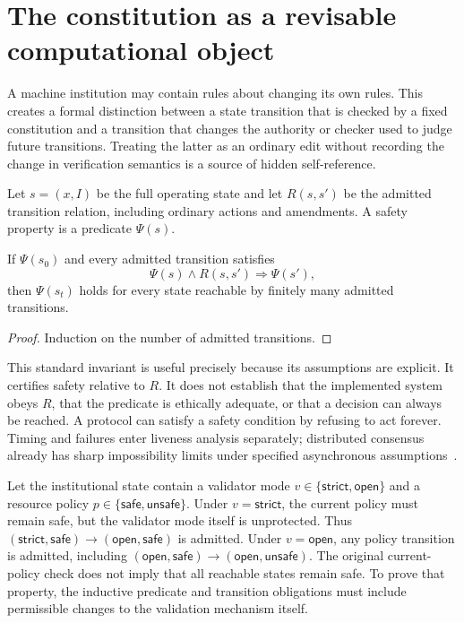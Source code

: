 \section{The constitution as a revisable computational object}\label{MS:sec:constitution}

A machine institution may contain rules about changing its own rules. This creates a formal distinction between a state transition that is checked by a fixed constitution and a transition that changes the authority or checker used to judge future transitions. Treating the latter as an ordinary edit without recording the change in verification semantics is a source of hidden self-reference.

Let $s=(x,I)$ be the full operating state and let $R(s,s')$ be the admitted transition relation, including ordinary actions and amendments. A safety property is a predicate $\Psi(s)$.

\begin{MSproposition}\label{MS:prop:safety}
If $\Psi(s_0)$ and every admitted transition satisfies
\[
\Psi(s)\wedge R(s,s')\Longrightarrow\Psi(s'),
\]
then $\Psi(s_t)$ holds for every state reachable by finitely many admitted transitions.
\end{MSproposition}
\begin{proof}
Induction on the number of admitted transitions.
\end{proof}

This standard invariant is useful precisely because its assumptions are explicit. It certifies safety relative to $R$. It does not establish that the implemented system obeys $R$, that the predicate is ethically adequate, or that a decision can always be reached. A protocol can satisfy a safety condition by refusing to act forever. Timing and failures enter liveness analysis separately; distributed consensus already has sharp impossibility limits under specified asynchronous assumptions~\cite{MS:flp}.

\begin{MScounterexample}\label{MS:ex:checker}
Let the institutional state contain a validator mode $v\in\{\mathsf{strict},\mathsf{open}\}$ and a resource policy $p\in\{\mathsf{safe},\mathsf{unsafe}\}$. Under $v=\mathsf{strict}$, the current policy must remain safe, but the validator mode itself is unprotected. Thus $(\mathsf{strict},\mathsf{safe})\to(\mathsf{open},\mathsf{safe})$ is admitted. Under $v=\mathsf{open}$, any policy transition is admitted, including $(\mathsf{open},\mathsf{safe})\to(\mathsf{open},\mathsf{unsafe})$. The original current-policy check does not imply that all reachable states remain safe. To prove that property, the inductive predicate and transition obligations must include permissible changes to the validation mechanism itself.
\end{MScounterexample}

